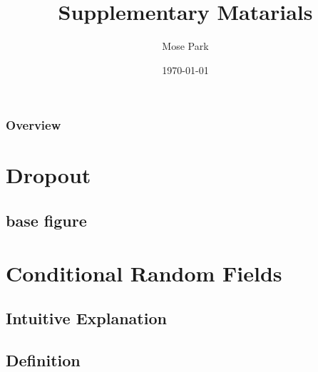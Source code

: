 \documentclass{beamer}
\title[Feature Noising Log-LS Prediction]{Supplementary Matarials} %
\author{Mose Park} %
\institute[UOS] %
{
Department of Statistics \\
\medskip
\textit{University of Seoul}
}
\date{\today} %
\begin{document}
\begin{frame}
\titlepage %
\end{frame}

\begin{frame}
\frametitle{Overview} %
\tableofcontents %
\end{frame}


\section{Dropout}
\subsection{base figure}

\section{Conditional Random Fields} %

\subsection{Intuitive Explanation} %
\subsection{Definition}
\end{document}
